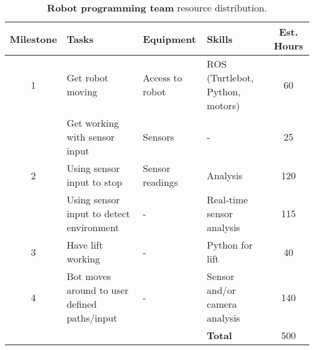 \documentclass{article}
\begin{document}
\begin{table*}[]
  \begin{center}
  \begin{small}
  \begin{tabular}{|c|l|l|l|c|}
    \hline
    {\bf Milestone} & {\bf Tasks} & {\bf Equipment} & {\bf Skills} & {\bf Est. Hours} \\ \hline
    1               & Get robot moving & Access to robot & ROS (Turtlebot, Python, motors) & 60 \\ \cline{2-5}
                    & Get working with sensor input & Sensors & - & 25 \\ \hline
    2               & Using sensor input to stop & Sensor readings & Analysis & 120 \\ \cline{2-5}
                    & Using sensor input to detect environment & - & Real-time sensor analysis & 115 \\ \hline
    3               & Have lift working & - & Python for lift & 40 \\ \hline
    4               & Bot moves around to user defined paths/input & - & Sensor and/or camera analysis & 140 \\ \hline
                    &  &  & {\bf Total} & 500 \\ \hline
  \end{tabular}
  \end{small}
  \caption{{\bf Robot programming team} resource distribution.}
  \end{center}
\end{table*}
\end{document}
